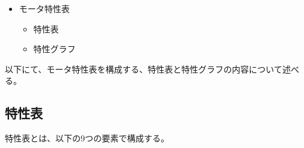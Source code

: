 \begin{itemize}
	\item モータ特性表
	\begin{itemize}
		\item 特性表
		\item 特性グラフ
	\end{itemize}
\end{itemize}
以下にて、モータ特性表を構成する、特性表と特性グラフの内容について述べる。
\subsection{特性表}\label{sub:tokuseihyou}
特性表とは、以下の9つの要素で構成する。
